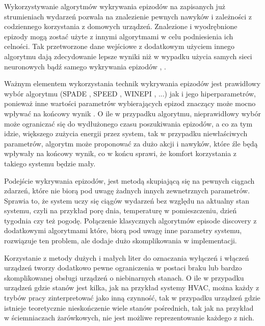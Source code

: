Wykorzystywanie algorytmów wykrywania epizodów na zapisanych już strumieniach wydarzeń pozwala na znalezienie pewnych nawyków i zależności z codziennego korzystania z domowych urządzeń. Znalezione i wyodrębnione epizody mogą zostać użyte z innymi algorytmami w celu podniesienia ich celności. Tak przetworzone dane wejściowe z dodatkowym użyciem innego algorytmu dają zdecydowanie lepsze wyniki niż w wypadku użycia samych sieci neuronowych bądź samego wykrywania epizodów \cite{episode_discovery_1}, \cite{episode_discovery_2}. 


Ważnym elementem wykorzystania technik wykrywania epizodów jest prawidłowy wybór algorytmu (SPADE \cite{SPADE}, SPEED \cite{SPEED}, WINEPI \cite{WINEPI}, ...) jak i jego hiperparametrów, ponieważ inne wartości parametrów wybierających epizod znaczący może mocno wpływać na końcowy wynik \cite{episode_discovery_2}. O ile w przypadku algorytmu, nieprawidłowy wybór może ograniczać się do wydłużonego czasu poszukiwania epizodów, a co za tym idzie, większego zużycia energii przez system, tak w przypadku niewłaściwych parametrów, algorytm może proponować za dużo akcji i nawyków, które źle będą wpływały na końcowy wynik, co w końcu sprawi, że komfort korzystania z takiego systemu będzie mały.

Podejście wykrywania epizodów, jest metodą skupiającą się na pewnych ciągach zdarzeń, które nie biorą pod uwagę żadnych innych zewnetrznych parametrów. Sprawia to, że system uczy się ciągów wydarzeń bez względu na aktualny stan systemu, czyli na przykład porę dnia, temperaturę w pomieszczeniu, dzień tygodnia czy też pogodę. Połączenie klasycznych algorytmów episode discovery z dodatkowymi algorytmami które, biorą pod uwagę inne parametry systemu, rozwiązuje ten problem, ale dodaje dużo skomplikowania w implementacji.

Korzystanie z metody dużych i małych liter do oznaczania wyłączeń i włączeń urządzeń tworzy dodatkowo pewne ograniczenia w postaci braku lub bardzo skomplikowanej obsługi urządzeń o niebinarnych stanach. O ile w przypadku urządzeń gdzie stanów jest kilka, jak na przykład systemy HVAC, można każdy z trybów pracy zinterpretować jako inną czynność, tak w przypadku urządzeń gdzie istnieje teoretycznie nieskończenie wiele stanów pośrednich, tak jak na przykład w ściemniaczach żarówkowych, nie jest możliwe reprezentowanie każdego z nich.

